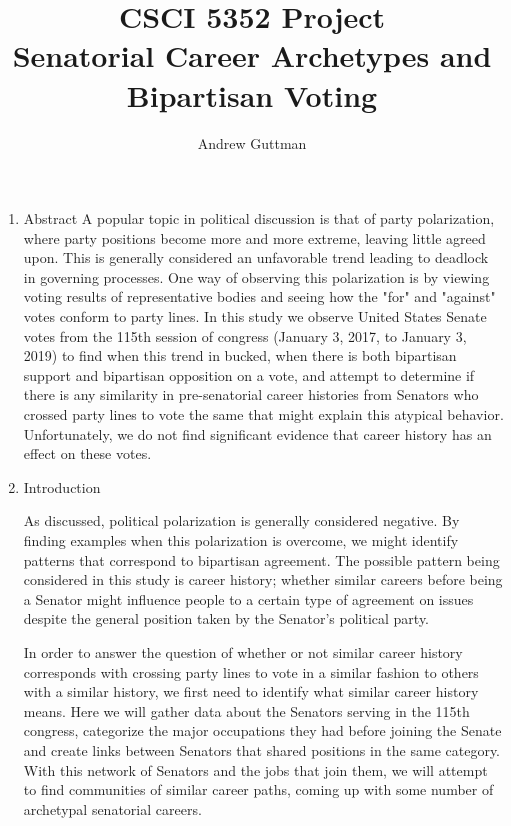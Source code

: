 \documentclass[11pt]{article}
\begin{document}
\author{Andrew Guttman}
\title{CSCI 5352 Project\\Senatorial Career Archetypes and Bipartisan Voting}
\maketitle

\medskip

\begin{enumerate}
	\item Abstract
	A popular topic in political discussion is that of party polarization, where party positions become more and more extreme, leaving little agreed upon. This is generally considered an unfavorable trend leading to deadlock in governing processes. One way of observing this polarization is by viewing voting results of representative bodies and seeing how the "for" and "against" votes conform to party lines. In this study we observe United States Senate votes from the 115th session of congress (January 3, 2017, to January 3, 2019) to find when this trend in bucked, when there is both bipartisan support and bipartisan opposition on a vote, and attempt to determine if there is any similarity in pre-senatorial career histories from Senators who crossed party lines to vote the same that might explain this atypical behavior. Unfortunately, we do not find significant evidence that career history has an effect on these votes.
	\item Introduction
	
	As discussed, political polarization is generally considered negative. By finding examples when this polarization is overcome, we might identify patterns that correspond to bipartisan agreement. The possible pattern being considered in this study is career history; whether similar careers before being a Senator might influence people to a certain type of agreement on issues despite the general position taken by the Senator's political party.
	
In order to answer the question of whether or not similar career history corresponds with crossing party lines to vote in a similar fashion to others with a similar history, we first need to identify what similar career history means. Here we will gather data about the Senators serving in the 115th congress, categorize the major occupations they had before joining the Senate and create links between Senators that shared positions in the same category. With this network of Senators and the jobs that join them, we will attempt to find communities of similar career paths, coming up with some number of archetypal senatorial careers.
	

\end{enumerate}
\end{document}
